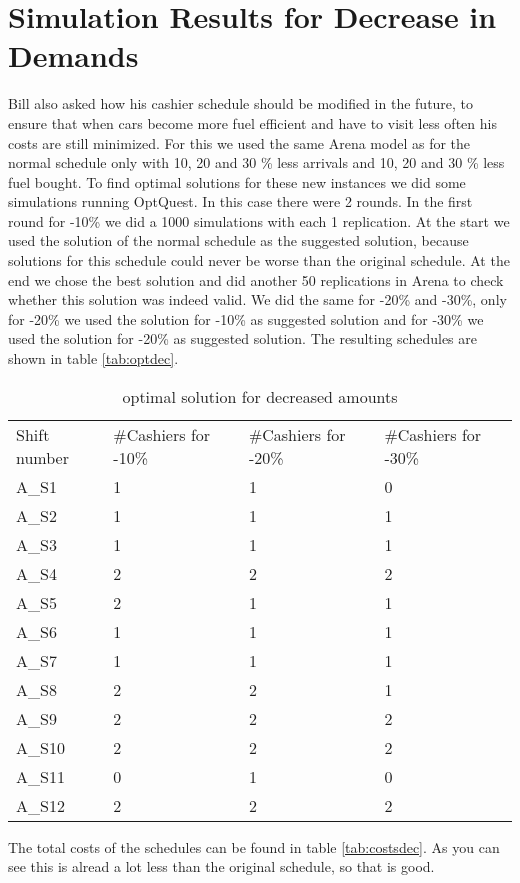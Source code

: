 \section{Simulation Results for Decrease in Demands}\label{app:demands}
Bill also asked how his cashier schedule should be modified in the future, to ensure that when cars become more fuel efficient and have to visit less often his costs are still minimized. 
For this we used the same Arena model as for the normal schedule only with 10, 20 and 30 \% less arrivals and 10, 20 and 30 \% less fuel bought. 
To find optimal solutions for these new instances we did some simulations running OptQuest. 
In this case there were 2 rounds.
In the first round for -10\% we did a 1000 simulations with each 1 replication. 
At the start we used the solution of the normal schedule as the suggested solution, because solutions for this schedule could never be worse than the original schedule.
At the end we chose the best solution and did another 50 replications in Arena to check whether this solution was indeed valid. 
We did the same for -20\% and -30\%, only for -20\% we used the solution for -10\% as suggested solution and for -30\% we used the solution for -20\% as suggested solution.
The resulting schedules are shown in table \autoref{tab:optdec}.

\begin{table}[h!]
	\centering
	\begin{tabular}{l | l | l | l |}
		Shift number & \#Cashiers for -10\% & \#Cashiers for -20\% & \#Cashiers for -30\% \\
		A\_S1 & 1  & 1 & 0\\
		A\_S2 & 1  & 1 & 1\\
		A\_S3 & 1  & 1 & 1\\
		A\_S4 & 2  & 2 & 2\\
		A\_S5 & 2  & 1 & 1\\
		A\_S6 & 1  & 1 & 1\\
		A\_S7 & 1  & 1 & 1\\
		A\_S8 & 2  & 2 & 1\\
		A\_S9 & 2  & 2 & 2\\
		A\_S10 & 2  & 2 & 2\\
		A\_S11 & 0  & 1 & 0\\
		A\_S12 & 2  & 2 & 2\\
	\end{tabular}
	\caption{optimal solution for decreased amounts}
	\label{tab:optdec}
\end{table}

The total costs of the schedules can be found in table \autoref{tab:costsdec}. As you can see this is alread a lot less than the original schedule, so that is good.

